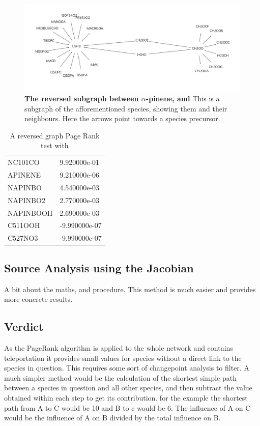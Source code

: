 \begin{figure}[H]
  \centering
  \includegraphics[width=\textwidth]{figures_c3/prtest0.png}
\caption{\textbf{The reversed subgraph between $\alpha$-pinene, and } This is a subgraph of the afforementioned species, showing them and their neighbours. Here the arrows point towards a species precursor. }
\label{fig:prtest1}
\end{figure}


\begin{table}[H]
\centering
\begin{tabular}{p{}p{}}
\toprule
NC101CO   &  9.920000e-01 \\
APINENE   &  9.210000e-06 \\
NAPINBO   &  4.540000e-03 \\
NAPINBO2  &  2.770000e-03 \\
NAPINBOOH &  2.690000e-03 \\
\midrule
C511OOH   & -9.990000e-07 \\
C527NO3   & -9.990000e-07 \\
\bottomrule
\end{tabular}

\caption{A reversed graph Page Rank test with }
\label{tab:ch2oo}
\end{table} 

\subsection{Source Analysis using the Jacobian}


A bit about the maths, and procedure. 
This method is much easier and provides more concrete results. 




\subsection{Verdict}
As the PageRank algorithm is applied to the whole network and contains teleportation it provides small values for species without a direct link to the species in question. This requires some sort of changepoint analysis to filter. A much simpler method would be the calculation of the shortest simple path between a species in question and all other species, and then subtract the value obtained within each step to get its contribution. for the example  the shortest path from A to C would be 10 and B to c would be 6. The influence of A on C would be the influence of A on B divided by the total influence on B.


